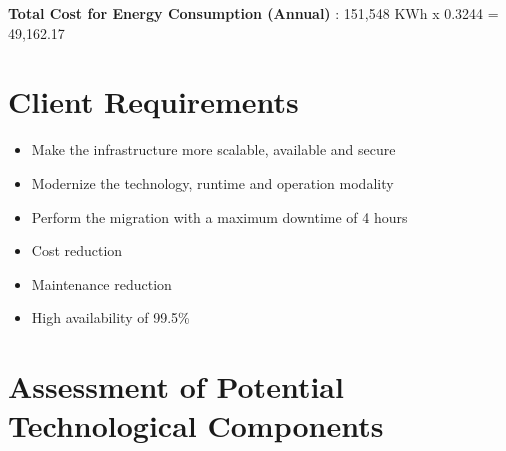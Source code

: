 \documentclass{llncs}
\begin{document}
\textbf{Total Cost for Energy Consumption (Annual)} : 151,548 KWh x 0.3244 \EUR{} = 49,162.17 \EUR{}

\section{Client Requirements}

\begin{itemize}
  \item Make the infrastructure more scalable, available and secure
  \item Modernize the technology, runtime and operation modality
  \item Perform the migration with a maximum downtime of 4 hours
  \item Cost reduction
  \item Maintenance reduction
  \item High availability of 99.5\%
\end{itemize}

\section{Assessment of Potential Technological Components}
\end{document}
